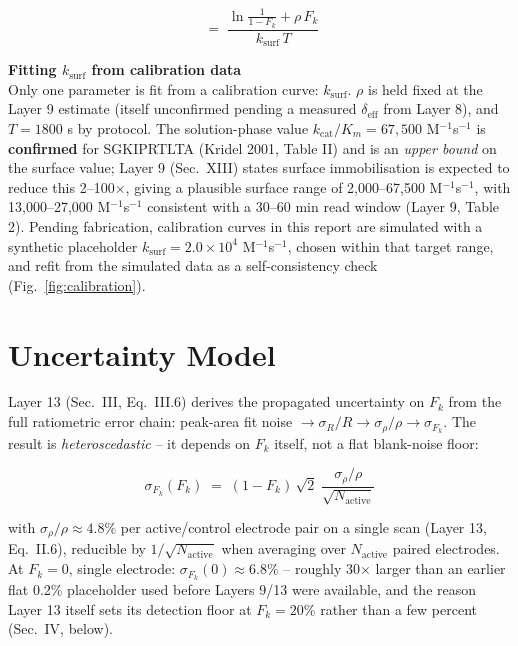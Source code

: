 \documentclass[11pt]{article}
\numberwithin{equation}{section}
\newcommand{\subhead}[1]{\vspace{0.6em}\noindent\textbf{#1}\vspace{0.2em}\\}
\begin{document}
\begin{equation}
[E] \;=\; \frac{\ln\!\frac{1}{1-F_k} + \rho\,F_k}{k_{\mathrm{surf}}\,T}
\label{eq:inverse}
\end{equation}

\subhead{Fitting $k_{\mathrm{surf}}$ from calibration data}
Only one parameter is fit from a calibration curve: $k_{\mathrm{surf}}$. $\rho$ is held fixed at the Layer 9
estimate (itself unconfirmed pending a measured $\delta_{\mathrm{eff}}$ from Layer 8), and $T=1800$ s by
protocol. The solution-phase value $k_{\mathrm{cat}}/K_m = 67{,}500$ M$^{-1}$s$^{-1}$ is
\textbf{confirmed} for SGKIPRTLTA (Kridel 2001, Table II) and is an \emph{upper bound} on the surface value;
Layer 9 (Sec.\ XIII) states surface immobilisation is expected to reduce this 2--100$\times$, giving a
plausible surface range of 2{,}000--67{,}500 M$^{-1}$s$^{-1}$, with 13{,}000--27{,}000 M$^{-1}$s$^{-1}$
consistent with a 30--60 min read window (Layer 9, Table 2). Pending fabrication, calibration curves in this
report are simulated with a synthetic placeholder $k_{\mathrm{surf}}=2.0\times10^4$ M$^{-1}$s$^{-1}$, chosen
within that target range, and refit from the simulated data as a self-consistency check
(Fig.~\ref{fig:calibration}).

\section{Uncertainty Model}

Layer 13 (Sec.\ III, Eq.\ III.6) derives the propagated uncertainty on $F_k$ from the full ratiometric error
chain: peak-area fit noise $\to\sigma_R/R\to\sigma_\rho/\rho\to\sigma_{F_k}$. The result is
\emph{heteroscedastic} -- it depends on $F_k$ itself, not a flat blank-noise floor:

\begin{keybox}
\begin{equation}
\sigma_{F_k}(F_k) \;=\; (1-F_k)\,\sqrt{2}\;\frac{\sigma_\rho/\rho}{\sqrt{N_{\mathrm{active}}}}
\label{eq:sigmaFk}
\end{equation}
\end{keybox}

\noindent with $\sigma_\rho/\rho \approx 4.8\%$ per active/control electrode pair on a single scan (Layer 13,
Eq.\ II.6), reducible by $1/\sqrt{N_{\mathrm{active}}}$ when averaging over $N_{\mathrm{active}}$ paired
electrodes. At $F_k=0$, single electrode: $\sigma_{F_k}(0)\approx6.8\%$ -- roughly 30$\times$ larger than an
earlier flat 0.2\% placeholder used before Layers 9/13 were available, and the reason Layer 13 itself sets its
detection floor at $F_k=20\%$ rather than a few percent (Sec.\ IV, below).
\end{document}
